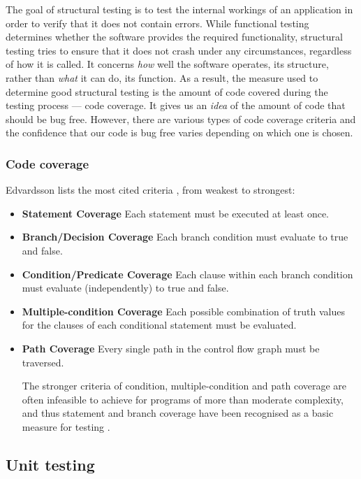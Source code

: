 The goal of structural testing is to test the internal workings \cite{mcminn2004search} of an application in order to verify that it does not contain errors. While functional testing determines whether the software provides the required functionality, structural testing tries to ensure that it does not crash under any circumstances, regardless of how it is called. It concerns \emph{how} well the software operates, its structure, rather than \emph{what} it can do, its function. As a result, the measure used to determine good structural testing is the amount of code covered during the testing process --- code coverage. It gives us an \emph{idea} of the amount of code that should be bug free. However, there are various types of code coverage criteria and the confidence that our code is bug free varies depending on which one is chosen.

\subsubsection{Code coverage}
Edvardsson lists the most cited criteria \cite{edvardsson1999survey}, from weakest to strongest:
\begin{itemize}
	\item \textbf{Statement Coverage} Each statement must be executed at least once.
 	\item \textbf{Branch/Decision Coverage} Each branch condition must evaluate to true and false.
 	\item \textbf{Condition/Predicate Coverage} Each clause within each branch condition must evaluate (independently) to true and false.
 	\item \textbf{Multiple-condition Coverage} Each possible combination of truth values for the clauses of each conditional statement must be evaluated.
 	\item \textbf{Path Coverage} Every single path in the control flow graph must be traversed.


The stronger criteria of condition, multiple-condition and path coverage are often infeasible to achieve for programs of more than moderate complexity, and thus statement and branch coverage have been recognised as a basic measure for testing \cite{edvardsson1999survey}.
\end{itemize}

\subsection{Unit testing}


